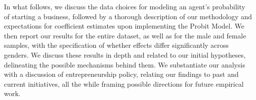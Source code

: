 In what follows, we discuss the data choices for modeling an agent’s probability of starting a business, followed by a thorough description of our methodology and expectations for coefficient estimates upon implementing the Probit Model.  We then report our results for the entire dataset, as well as for the male and female samples, with the specification of whether effects differ significantly across genders. We discuss these results in depth and related to our initial hypotheses, delineating the possible mechanisms behind them. We substantiate our analysis with a discussion of entrepreneurship policy, relating our findings to past and current initiatives, all the while framing possible directions for future empirical work. 
